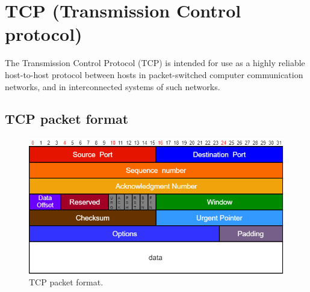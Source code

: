 \section{TCP (Transmission Control protocol)}
The Transmission Control Protocol (TCP) is intended for use as a highly
reliable host-to-host protocol between hosts in packet-switched computer
communication networks, and in interconnected systems of such networks\cite{RFC793}.
\subsection{TCP packet format}
\begin{figure}[h]
\centering\footnotesize
\includegraphics[scale=0.6]{Images/Transport/TCP_packet_format}
\caption{TCP packet format.}
\end{figure}

